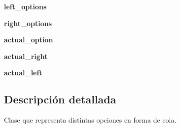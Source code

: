 \begin{DoxyCompactItemize}
\item 
\hypertarget{classengine_1_1charactermenu_1_1GroupOption_adeac0c9a956cd0332aaa613c773cd94c}{
{\bfseries left\-\_\-options}}
\label{classengine_1_1charactermenu_1_1GroupOption_adeac0c9a956cd0332aaa613c773cd94c}

\item 
\hypertarget{classengine_1_1charactermenu_1_1GroupOption_ad06fef469152c0cb35e58d499c2f6c89}{
{\bfseries right\-\_\-options}}
\label{classengine_1_1charactermenu_1_1GroupOption_ad06fef469152c0cb35e58d499c2f6c89}

\item 
\hypertarget{classengine_1_1charactermenu_1_1GroupOption_abb5a4f76b83ca75ca84f0e1f8cb18329}{
{\bfseries actual\-\_\-option}}
\label{classengine_1_1charactermenu_1_1GroupOption_abb5a4f76b83ca75ca84f0e1f8cb18329}

\item 
\hypertarget{classengine_1_1charactermenu_1_1GroupOption_a2b3648755ed37c0b029eb1ce22676738}{
{\bfseries actual\-\_\-right}}
\label{classengine_1_1charactermenu_1_1GroupOption_a2b3648755ed37c0b029eb1ce22676738}

\item 
\hypertarget{classengine_1_1charactermenu_1_1GroupOption_a0202c76d46627d8a4b65239651e448e8}{
{\bfseries actual\-\_\-left}}
\label{classengine_1_1charactermenu_1_1GroupOption_a0202c76d46627d8a4b65239651e448e8}

\end{DoxyCompactItemize}


\subsection{\-Descripción detallada}
\-Clase que representa distintas opciones en forma de cola. 


